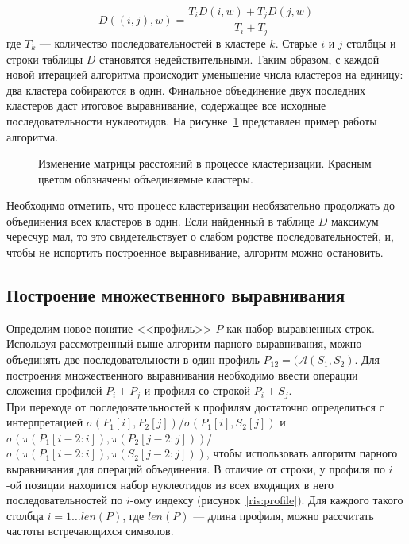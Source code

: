 \begin{equation}\label{eq:upgma}
D((i,j), w)=\frac{T_iD(i,w)+T_jD(j,w)}{T_i+T_j}
\end{equation}
где $T_k$ --- количество последовательностей в кластере $k$. Старые $i$ и $j$ столбцы и строки таблицы $D$ становятся недействительными. Таким образом, с каждой новой итерацией алгоритма происходит уменьшение числа кластеров на единицу: два кластера собираются в один. Финальное объединение двух последних кластеров даст итоговое выравнивание, содержащее все исходные последовательности нуклеотидов. На рисунке~\ref{ris:UPGMA} представлен пример работы алгоритма.
\begin{figure}[h]
	\caption{Изменение матрицы расстояний в процессе кластеризации. Красным цветом обозначены объединяемые кластеры.}
	\label{ris:UPGMA}
\end{figure}

\indent Необходимо отметить, что процесс кластеризации необязательно продолжать до объединения всех кластеров в один. Если найденный в таблице $D$ максимум чересчур мал, то это свидетельствует о слабом родстве последовательностей, и, чтобы не испортить построенное выравнивание, алгоритм можно остановить.

\subsection[Построение множественного выравнивания]{\large Построение множественного выравнивания}
\hspace{\parindent} Определим новое понятие <<профиль>> $P$ как набор выравненных строк. Используя рассмотренный выше алгоритм парного выравнивания, можно объединять две последовательности в один профиль $P_{12}=(\mathcal{A}(S_1, S_2)$. Для построения множественного выравнивания необходимо ввести операции сложения профилей $P_i + P_j$ и профиля со строкой $P_i + S_j$.\\
\indent При переходе от последовательностей к профилям достаточно определиться с интерпретацией $\sigma(P_1[i], P_2[j])$/$\sigma(P_1[i], S_2[j])$ и $\sigma(\pi(P_1[i-2:i]), \pi(P_2[j-2:j]))$/$\sigma(\pi(P_1[i-2:i]), \pi(S_2[j-2:j]))$, чтобы использовать алгоритм парного выравнивания для операций объединения. В отличие от строки, у профиля по $i$-ой позиции находится набор нуклеотидов из всех входящих в него последовательностей по $i$-ому индексу (рисунок~\ref{ris:profile}). Для каждого такого столбца $i=1 \dots len(P)$, где $len(P)$ --- длина профиля, можно рассчитать частоты встречающихся символов.

